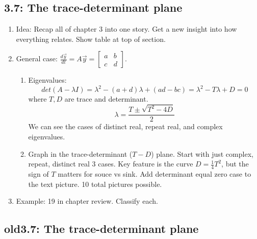 \documentclass{article}
\begin{document}
\subsection{3.7: The trace-determinant plane}
\begin{enumerate}
\item Idea: Recap all of chapter 3 into one story. Get a new insight into how everything relates. Show table at top of section.

\item General case: $\frac{d \vec{y}}{dt} = A \vec{y} = \begin{bmatrix}
a & b \\
c & d
\end{bmatrix}$.
\begin{enumerate}
\item Eigenvalues: 
\[
det(A-\lambda I) = \lambda^2 - (a+d) \lambda + (ad-bc)=\lambda^2-T\lambda+D=0
\] 
where $T,D$ are trace and determinant.
\[
\lambda = \frac{T \pm \sqrt{T^2-4D}}{2}
\]
We can see the cases of distinct real, repeat real, and complex eigenvalues.
\item Graph in the trace-determinant ($T-D$) plane. Start with just complex, repeat, distinct real 3 cases. Key feature is the curve $D=\frac{1}{4}T^2$, but the sign of $T$ matters for souce vs sink. Add determinant equal zero case to the text picture. 10 total pictures possible.
\end{enumerate}

\item Example: 19 in chapter review. Classify each.

\end{enumerate}

\subsection{old3.7: The trace-determinant plane}
\end{document}
